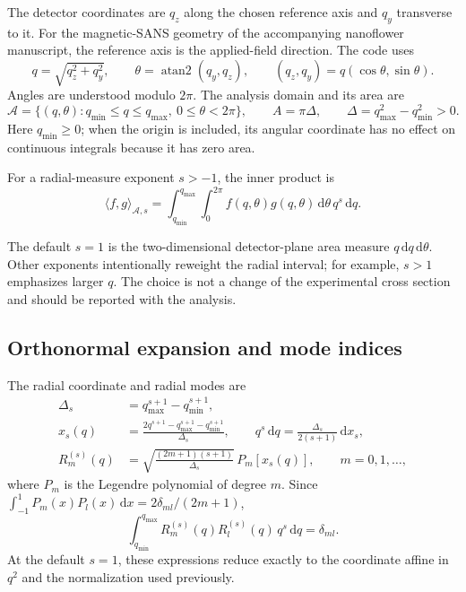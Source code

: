 \documentclass[aps,prb,preprint,onecolumn,notitlepage,amsmath,amssymb,
  superscriptaddress,floatfix]{revtex4-2}
\newcommand{\dd}{\,\mathrm{d}}
\newcommand{\Ann}{\mathcal{A}}
\begin{document}
The detector coordinates are $q_z$ along the chosen reference axis and
$q_y$ transverse to it. For the magnetic-SANS geometry of the accompanying
nanoflower manuscript, the reference axis is the applied-field direction.
The code uses
\begin{equation}
 q=\sqrt{q_z^2+q_y^2},\qquad
 \theta=\operatorname{atan2}(q_y,q_z),\qquad
 (q_z,q_y)=q(\cos\theta,\sin\theta).
 \label{eq:coordinates}
\end{equation}
Angles are understood modulo $2\pi$. The analysis domain and its area are
\begin{equation}
 \Ann=\{(q,\theta):q_{\min}\leq q\leq q_{\max},\ 0\leq\theta<2\pi\},
 \qquad A=\pi\Delta,\qquad
 \Delta=q_{\max}^2-q_{\min}^2>0.
 \label{eq:annulus}
\end{equation}
Here $q_{\min}\geq0$; when the origin is included, its angular coordinate
has no effect on continuous integrals because it has zero area.

\begin{samepage}
For a radial-measure exponent $s>-1$, the inner product is
\begin{equation}
 \langle f,g\rangle_{\Ann,s}
 =\int_{q_{\min}}^{q_{\max}}\int_0^{2\pi}
 f(q,\theta)g(q,\theta)\dd\theta\,q^s\dd q.
 \label{eq:inner-product}
\end{equation}
\end{samepage}
The default $s=1$ is the two-dimensional detector-plane area measure
$q\dd q\dd\theta$. Other exponents intentionally reweight the radial
interval; for example, $s>1$ emphasizes larger $q$. The choice is not a
change of the experimental cross section and should be reported with the
analysis.

\subsection{Orthonormal expansion and mode indices}

The radial coordinate and radial modes are
\begin{align}
 \Delta_s&=q_{\max}^{s+1}-q_{\min}^{s+1},\nonumber\\
 x_s(q)&=\frac{2q^{s+1}-q_{\max}^{s+1}-q_{\min}^{s+1}}{\Delta_s},
 \qquad q^s\dd q=\frac{\Delta_s}{2(s+1)}\dd x_s,
 \label{eq:radial-coordinate}\\
 R_m^{(s)}(q)&=\sqrt{\frac{(2m+1)(s+1)}{\Delta_s}}\,P_m[x_s(q)],
 \qquad m=0,1,\ldots,
 \label{eq:radial-modes}
\end{align}
where $P_m$ is the Legendre polynomial of degree $m$. Since
$\int_{-1}^{1}P_m(x)P_l(x)\dd x=2\delta_{ml}/(2m+1)$,
\begin{equation}
 \int_{q_{\min}}^{q_{\max}}R_m^{(s)}(q)R_l^{(s)}(q)\,q^s\dd q=\delta_{ml}.
 \label{eq:radial-orthogonality}
\end{equation}
At the default $s=1$, these expressions reduce exactly to the coordinate
affine in $q^2$ and the normalization used previously.
\end{document}
